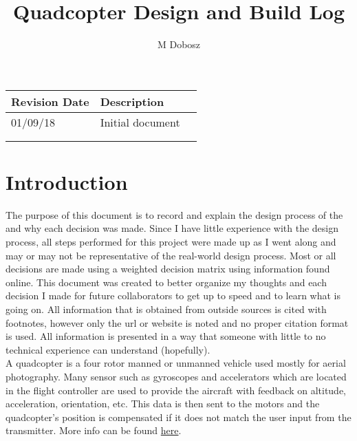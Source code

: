 \documentclass[12pt]{article}
\title{Quadcopter Design and Build Log}
\author{M Dobosz}
\begin{document}
\begin{titlepage}
\vspace*{-4.5cm}
\hspace*{-4.1cm}
{\let\newpage\relax\maketitle}

\begin{table}[b]
\begin{center}
\begin{tabular}{| l | l | l |}
\hline
\textbf{Revision Date} & \textbf{Description} \\ \hline
01/09/18 & Initial document \\ \hline
& \\ \hline
& \\ \hline

\end{tabular}
\end{center}
\end{table}
\end{titlepage}


\pagebreak
\tableofcontents
\pagebreak
\section{Introduction}

The purpose of this document is to record and explain the design process of the  and why each decision was made. Since I have little experience with the design process, all steps performed for this project were made up as I went along and may or may not be representative of the real-world design process. Most or all decisions are made using a weighted decision matrix using information found online. This document was created to better organize my thoughts and each decision I made for future collaborators to get up to speed and to learn what is going on. All information that is obtained from outside sources is cited with footnotes, however only the url or website is noted and no proper citation format is used. All information is presented in a way that someone with little to no technical experience can understand (hopefully).
\\

A quadcopter is a four rotor manned or unmanned vehicle used mostly for aerial photography. Many sensor such as gyroscopes and accelerators which are located in the flight controller are used to provide the aircraft with feedback on altitude, acceleration, orientation, etc. This data is then sent to the motors and the quadcopter's position is compensated if it does not match the user input from the transmitter. More info can be found \href{https://en.wikipedia.org/wiki/Quadcopter}{\color{cyan}here}.
\end{document}
